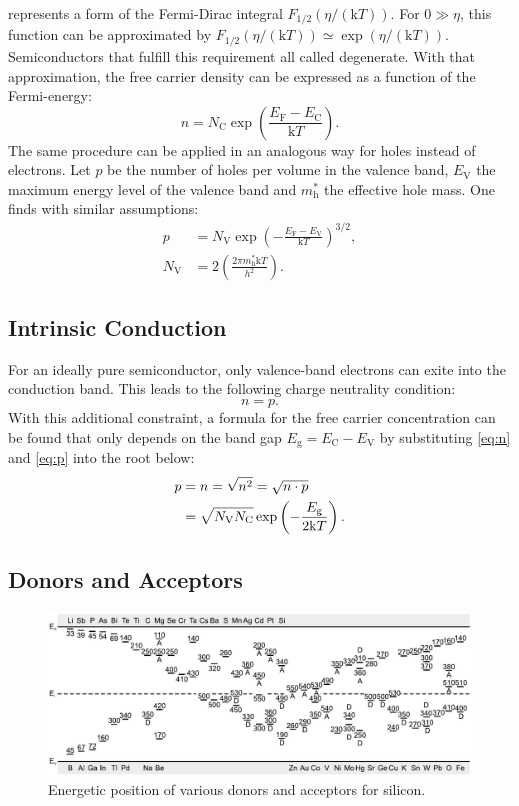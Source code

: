  represents a form of the Fermi-Dirac integral
$F_{1 /2}(\eta  / (\mathrm{k}T))$.
For $0 \gg \eta$,
this function can be approximated by $F_{1 /2}(\eta  / (\mathrm{k}T))
	\simeq \exp(\eta /(\mathrm{k}T))$.
Semiconductors that fulfill this requirement all called degenerate.
With that approximation, the free carrier density can be expressed as
a function of the Fermi-energy:
\begin{equation}
	n	= { N_{\mathrm{C}} }\exp\left( \frac{E_{\mathrm{F}}
		-E_{\mathrm{C}}}{\mathrm{k}T} \right).
	\label{eq:n}
\end{equation}
The same procedure can be applied in an analogous way for holes instead of
electrons.
Let $p$ be the number of holes per volume in the valence band, $E_\mathrm{V}$ 
the maximum energy level of the valence band and $m^*_\mathrm{h}$ the
effective hole mass. One finds with similar assumptions:
\begin{align}
	p            & = N_\mathrm{V} \exp
	\left( - \frac{E_{\mathrm{F}}-E_{\mathrm{V}}}{\mathrm{k}T} \right)^{3 / 2}
	\label{eq:p},                                        \\
	N_\mathrm{V} & = 2 \left( \frac{2 \pi m^*_\mathrm{h}
		\mathrm{k}T}{h^2} \right).
\end{align}

\subsection{Intrinsic Conduction}
For an ideally pure semiconductor, only valence-band electrons
can exite into the conduction band.
This leads to the following charge neutrality condition:
\begin{equation}
	n = p.
\end{equation}
With this additional constraint, a formula for the free
carrier concentration can be found that only depends on the
band gap $E_\mathrm{g} = E_\mathrm{C} - E_\mathrm{V}$ by
substituting \cref{eq:n} and \cref{eq:p}
into the root below:
\begin{align}
	p & = n = \sqrt{n^2} = \sqrt{n \cdot p} \notag \\
	  & =\sqrt{ N_{\mathrm{V}}N_{\mathrm{C}} }
	\exp\left( -\frac{E_{\mathrm{g}}}{2\mathrm{k}T} \right).
\end{align}

\subsection{Donors and Acceptors}
\begin{figure}
	\centering
	\includegraphics[width=0.6\linewidth]{../assets/energy_level.png}
	\caption{Energetic position of various donors and acceptors
		for silicon. }
	\label{fig:energy_level}
\end{figure}

